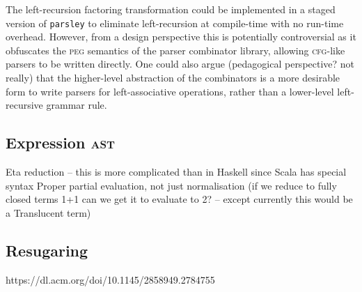 \documentclass[../../main.tex]{subfiles}
\begin{document}
The left-recursion factoring transformation could be implemented in a staged version of \texttt{parsley} to eliminate left-recursion at compile-time with no run-time overhead.
However, from a design perspective this is potentially controversial as it obfuscates the \textsc{peg} semantics of the parser combinator library, allowing \textsc{cfg}-like parsers to be written directly.
One could also argue (pedagogical perspective? not really) that the higher-level abstraction of the  combinators is a more desirable form to write parsers for left-associative operations, rather than a lower-level left-recursive grammar rule.


\subsection{Expression \textsc{ast}}
Eta reduction -- this is more complicated than in Haskell since Scala has special syntax %
Proper partial evaluation, not just normalisation (if we reduce to fully closed terms 1+1 can we get it to evaluate to 2? -- except currently this would be a Translucent term)

\subsection{Resugaring}
https://dl.acm.org/doi/10.1145/2858949.2784755
\end{document}
